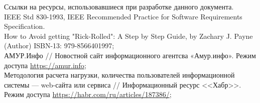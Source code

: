 Ссылки на ресурсы, использовавшиеся при разработке данного документа.\\[2mm]

\noindent
IEEE Std 830-1993, IEEE Recommended Practice for Software Requirements Specification.
\\[2mm]
How to Avoid getting "Rick-Rolled": A Step by Step Guide, by Zachary J. Payne (Author) ISBN-13: 979-8566401997;
\\[2mm]
АМУР.Инфо // Новостной сайт информационного агентсва «Амур.инфо». Режим доступа \url{https://amur.info};
\\[2mm]
Методология расчета нагрузки, количества пользователей информационной системы — web-сайта или сервиса // Информационный ресурс <<Хабр>>. Режим доступа \url{https://habr.com/ru/articles/187386/};



